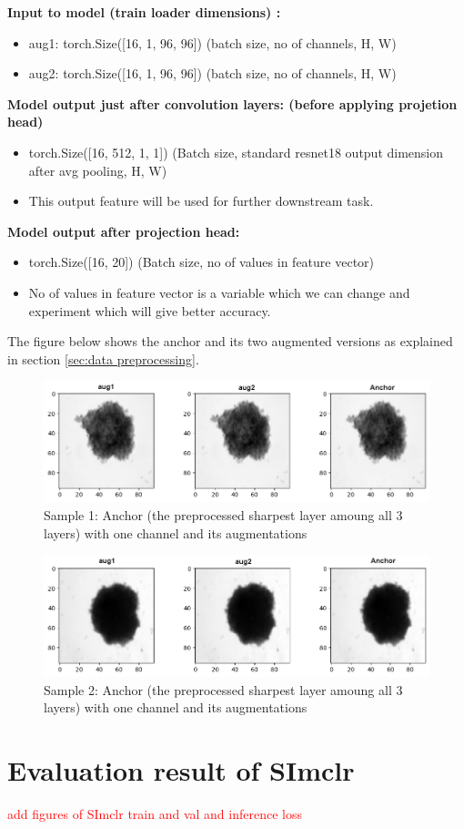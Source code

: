 \textbf{Input to model (train loader dimensions) :} 
\begin{itemize}
   \item aug1: torch.Size([16, 1, 96, 96])        (batch size, no of channels, H, W)
   \item aug2: torch.Size([16, 1, 96, 96])        (batch size, no of channels, H, W) \vspace{1em}
\end{itemize}
\textbf{Model output just after convolution layers: (before applying projetion head)} 
\begin{itemize}
  \item torch.Size([16, 512, 1, 1]) (Batch size, standard resnet18 output dimension after avg pooling, H, W)   
  \item This output feature will be used for further downstream task.  \vspace{1em}
\end{itemize}

\textbf{Model output after projection head:}
\begin{itemize}
  \item torch.Size([16, 20])  (Batch size, no of values in feature vector)  
  \item No of values in feature vector is a variable which we can change and experiment which will give better accuracy.
\end{itemize}

The figure below shows the anchor and its two augmented versions as explained in section \ref{sec:data preprocessing}.
\begin{figure}[H]
  \centering
  \includegraphics[width=0.9\linewidth]{figures/1_1.png} %
  \caption{Sample 1: Anchor (the preprocessed sharpest layer amoung all 3 layers) with one channel and its augmentations}
  \label{fig:1doutput1}
\end{figure}

\begin{figure}[H]
  \centering
  \includegraphics[width=0.9\linewidth]{figures/1_2.png} %
  \caption{Sample 2: Anchor (the preprocessed sharpest layer amoung all 3 layers) with one channel and its augmentations}
  \label{fig:1doutput3}
\end{figure}


\section{Evaluation result of SImclr} \label{sec:Evaluation result of SImclr}


\textcolor{red}{add figures of SImclr train and val and inference loss} 